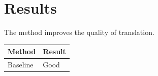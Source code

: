 \section{Results}
The method improves the quality of translation.

\begin{tabular}{ll}
\toprule
Method & Result \\
\midrule
Baseline & Good \\
\bottomrule
\end{tabular}
